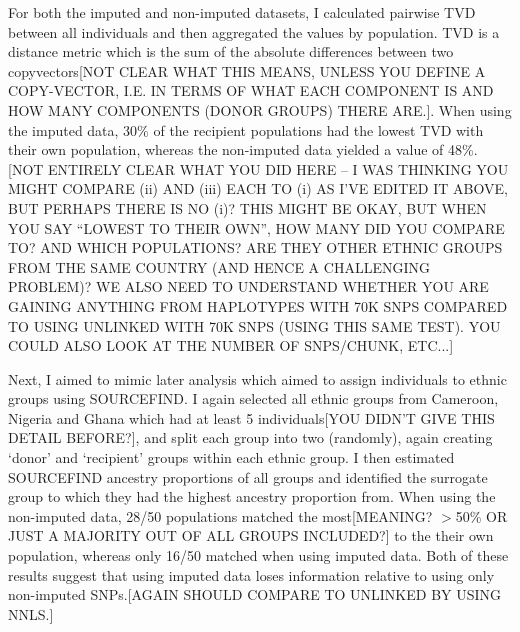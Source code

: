 {For both the imputed and non-imputed datasets, I calculated pairwise TVD between all individuals and then aggregated the values by population. TVD is a distance metric which is the sum of the absolute differences between two copyvectors[NOT CLEAR WHAT THIS MEANS, UNLESS YOU DEFINE A COPY-VECTOR, I.E. IN TERMS OF WHAT EACH COMPONENT IS AND HOW MANY COMPONENTS (DONOR GROUPS) THERE ARE.]. When using the imputed data, 30\% of the recipient populations had the lowest TVD with their own population, whereas the non-imputed data yielded a value of 48\%.[NOT ENTIRELY CLEAR WHAT YOU DID HERE -- I WAS THINKING YOU MIGHT COMPARE (ii) AND (iii) EACH TO (i) AS I'VE EDITED IT ABOVE, BUT PERHAPS THERE IS NO (i)? THIS MIGHT BE OKAY, BUT WHEN YOU SAY ``LOWEST TO THEIR OWN'', HOW MANY DID YOU COMPARE TO? AND WHICH POPULATIONS? ARE THEY OTHER ETHNIC GROUPS FROM THE SAME COUNTRY (AND HENCE A CHALLENGING PROBLEM)? WE ALSO NEED TO UNDERSTAND WHETHER YOU ARE GAINING ANYTHING FROM HAPLOTYPES WITH 70K SNPS COMPARED TO USING UNLINKED WITH 70K SNPS (USING THIS SAME TEST). YOU COULD ALSO LOOK AT THE NUMBER OF SNPS/CHUNK, ETC...]

Next, I aimed to mimic later analysis which aimed to assign individuals to ethnic groups using SOURCEFIND. I again selected all ethnic groups from Cameroon, Nigeria and Ghana {\color{red}which had at least 5 individuals[YOU DIDN'T GIVE THIS DETAIL BEFORE?]}, and split each group into two (randomly), again creating `donor' and `recipient' groups within each ethnic group. I then estimated SOURCEFIND ancestry proportions of all groups and identified the surrogate group to which they had the highest ancestry proportion from. When using the non-imputed data, 28/50 populations matched the most{\color{red}[MEANING? $>$50\% OR JUST A MAJORITY OUT OF ALL GROUPS INCLUDED?]} to the their own population, whereas only 16/50 matched when using imputed data. Both of these results suggest that using imputed data loses information relative to using only non-imputed SNPs.{\color{red}[AGAIN SHOULD COMPARE TO UNLINKED BY USING NNLS.]}

}
